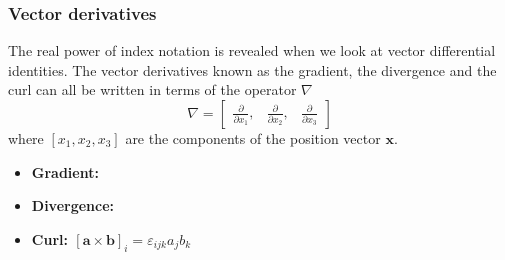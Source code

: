 \documentclass[notes]{beamer}
\begin{document}
\begin{frame}
\frametitle{Vector derivatives}
The real power of index notation is revealed when we look at vector differential identities.
The vector derivatives known as the gradient, the divergence and the curl can all be
written in terms of the operator $\nabla$
\begin{equation*}
	\nabla = \begin{bmatrix}
		\frac{\partial}{\partial x_1}, &
		\frac{\partial}{\partial x_2}, &
		\frac{\partial}{\partial x_3}
	\end{bmatrix}
\end{equation*}
where $\left[x_1, x_2, x_3 \right]$ are the components of the position vector $\mathbf{x}$.
\begin{itemize}
	\item \textbf{Gradient:}
	\mode<handout>{
		\vspace{1cm}
	} 
	\item \textbf{Divergence:} 
	\mode<handout>{
		\vspace{1cm}
	}
	\item \textbf{Curl: $[\mathbf{a \times b}]_i = \varepsilon_{ijk} a_j b_k$} 	
	\mode<handout>{
		\vspace{1cm}
	} 
\end{itemize}
\end{frame}

\end{document}
